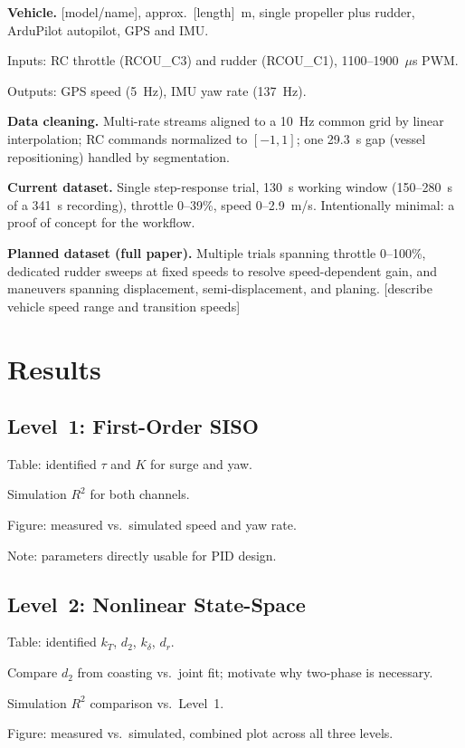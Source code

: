 \documentclass[11pt]{article}
\begin{document}
\begin{outline}
\item \textbf{Vehicle.} [model/name], approx.\ [length]~m, single propeller plus
  rudder, ArduPilot autopilot, GPS and IMU.
  \begin{outline}
  \item Inputs: RC throttle (RCOU\_C3) and rudder (RCOU\_C1), 1100--1900~$\mu$s PWM.
  \item Outputs: GPS speed (5~Hz), IMU yaw rate (137~Hz).
  \end{outline}
\item \textbf{Data cleaning.} Multi-rate streams aligned to a 10~Hz common grid by
  linear interpolation; RC commands normalized to $[-1,1]$; one 29.3~s gap (vessel
  repositioning) handled by segmentation.
\item \textbf{Current dataset.} Single step-response trial, 130~s working window
  (150--280~s of a 341~s recording), throttle 0--39\%, speed 0--2.9~m/s.
  Intentionally minimal: a proof of concept for the workflow.
\item \textbf{Planned dataset (full paper).} Multiple trials spanning throttle
  0--100\%, dedicated rudder sweeps at fixed speeds to resolve speed-dependent gain,
  and maneuvers spanning displacement, semi-displacement, and planing.
  [describe vehicle speed range and transition speeds]
\end{outline}

\section{Results}
\label{sec:results}

\subsection{Level~1: First-Order SISO}
\begin{outline}
\item Table: identified $\tau$ and $K$ for surge and yaw.
\item Simulation $R^2$ for both channels.
\item Figure: measured vs.\ simulated speed and yaw rate.
\item Note: parameters directly usable for PID design.
\end{outline}

\subsection{Level~2: Nonlinear State-Space}
\begin{outline}
\item Table: identified $k_T$, $d_2$, $k_\delta$, $d_r$.
\item Compare $d_2$ from coasting vs.\ joint fit; motivate why two-phase is
  necessary.
\item Simulation $R^2$ comparison vs.\ Level~1.
\item Figure: measured vs.\ simulated, combined plot across all three levels.
\end{outline}
\end{document}
